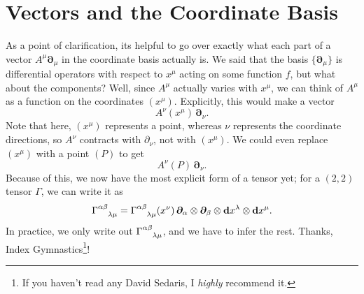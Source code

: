 \section{Vectors and the Coordinate Basis}
As a point of clarification, its helpful to go over exactly what each part of a vector $A^\mu \bm{\partial}_\mu$ in the coordinate basis actually is.
We said that the basis $\{\bm{\partial}_\mu\}$ is differential operators with respect to $x^\mu$ acting on some function $f$, but what about the components?
Well, since $A^\mu$ actually varies with $x^\mu$, we can think of $A^\mu$ as a function on the coordinates $(x^\mu)$.
Explicitly, this would make a vector
\[ A^\nu(x^\mu)\,\bm{\partial}_\nu. \]
Note that here, $(x^\mu)$ represents a point, whereas $\nu$ represents the coordinate directions, so $A^\nu$ contracts with $\partial_\nu$, not with $(x^\mu)$.
We could even replace $(x^\mu)$ with a point $(P)$ to get
\[ A^\nu (P)\, \bm{\partial}_\nu. \]
Because of this, we now have the most explicit form of a tensor yet; for a $(2,2)$ tensor $\Gamma$, we can write it as
\[ \tensor{\Gamma}{^{\alpha\beta}_{\lambda\mu}} = \tensor{\Gamma}{^{\alpha\beta}_{\lambda\mu}} (x^\nu) \,\bm{\partial}_\alpha \otimes \bm{\partial}_\beta \otimes \vec{d}x^\lambda \otimes \vec{d}x^\mu. \]
In practice, we only write out $\tensor{\Gamma}{^{\alpha\beta}_{\lambda\mu}}$, and we have to infer the rest.
Thanks, Index Gymnastics\footnote{If you haven't read any David Sedaris, I \emph{highly} recommend it.}!
